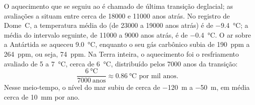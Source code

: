 \begin{example}
O aquecimento que se seguiu ao  é chamado de última
transição deglacial; as avaliações a situam entre cerca de \num{18000} e
\num{11000} anos atrás. No registro de Dome~C, a temperatura média do
 (de \num{23000} a \num{19000} anos atrás) é de
\qty{-9.4}{\degreeCelsius}; a média do intervalo seguinte, de \num{11000} a
\num{9000} anos atrás, é de \qty{-0.4}{\degreeCelsius}. O ar sobre a
Antártida se aqueceu \qty{9.0}{\degreeCelsius}, enquanto o seu gás
carbônico subia de \qty{190}{ppm} a \qty{264}{ppm}, ou seja, \qty{74}{ppm}.
Na Terra inteira, o aquecimento foi o resfriamento avaliado de 5 a
\qty{7}{\degreeCelsius}, cerca de \qty{6}{\degreeCelsius}, distribuído pelos
\num{7000} anos da transição:
\[
  \frac{\qty{6}{\degreeCelsius}}{\num{7000}\ \text{anos}} \approx
  \qty{0.86}{\degreeCelsius} \text{ por mil anos.}
\]
Nesse meio-tempo, o nível do mar subiu de cerca de \qty{-120}{m} a
\qty{-50}{m}, em média cerca de \qty{10}{mm} por ano.
\end{example}

